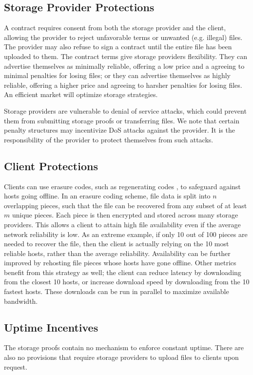 \documentclass[twocolumn]{article}
\begin{document}
\subsection{Storage Provider Protections}
A contract requires consent from both the storage provider and the client, allowing the provider to reject unfavorable terms or unwanted (e.g. illegal) files.
The provider may also refuse to sign a contract until the entire file has been uploaded to them.
The contract terms give storage providers flexibility.
They can advertise themselves as minimally reliable, offering a low price and a agreeing to minimal penalties for losing files;
or they can advertise themselves as highly reliable, offering a higher price and agreeing to harsher penalties for losing files.
An efficient market will optimize storage strategies.

Storage providers are vulnerable to denial of service attacks, which could prevent them from submitting storage proofs or transferring files.
We note that certain penalty structures may incentivize DoS attacks against the provider.
It is the responsibility of the provider to protect themselves from such attacks.

\subsection{Client Protections}
Clients can use erasure codes, such as regenerating codes \cite{reg}, to safeguard against hosts going offline.
In an erasure coding scheme, file data is split into $n$ overlapping pieces, such that the file can be recovered from any subset of at least $m$ unique pieces.
Each piece is then encrypted and stored across many storage providers.
This allows a client to attain high file availability even if the average network reliability is low.
As an extreme example, if only 10 out of 100 pieces are needed to recover the file, then the client is actually relying on the 10 most reliable hosts, rather than the average reliability.
Availability can be further improved by rehosting file pieces whose hosts have gone offline.
Other metrics benefit from this strategy as well; the client can reduce latency by downloading from the closest 10 hosts, or increase download speed by downloading from the 10 fastest hosts.
These downloads can be run in parallel to maximize available bandwidth.

\subsection{Uptime Incentives}
The storage proofs contain no mechanism to enforce constant uptime.
There are also no provisions that require storage providers to upload files to clients upon request.
\end{document}
